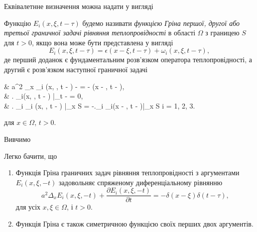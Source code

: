 Еквівалетнне визначення можна надати у вигляді
\begin{definition}
	Функцію $E_i (x, \xi, t - \tau)$ будемо називати \textit{функцією Гріна першої, другої або третьої граничної задачі рівняння теплопровідності} в області $\Omega$ з границею $S$ для $t > 0$, якщо вона може бути представлена у вигляді
	\begin{equation}
		E_i(x, \xi, t - \tau) = \epsilon(x - \xi, t - \tau) + \omega_i(x, \xi, t - \tau),
	\end{equation}
	де  перший доданок є фундаментальним розв'язком оператора теплопровідності, а другий  є розв'язком наступної граничної задачі
	\begin{system}
		& a^2 \Delta_x \omega_i (x, \xi, t - \tau) -  = - \delta(x - \xi, t - \tau), \\
		& \left. \omega_i(x, \xi, t - \tau) \right|_{t - \tau {}} = 0, \\
		& \left. \ell_i \omega_i (x, \xi, t - \tau) \right|_{x \in S} = -\left.\ell_i \epsilon_i(x - \xi, t - \tau)\right|_{x \in S} \quad i = 1, 2, 3.
	\end{system}
	для $x \in \Omega$, $t > 0$.
\end{definition}

Вивчимо 
\begin{properties}
	Легко бачити, що 
	\begin{enumerate}
		\item Функція Гріна граничних задач рівняння теплопровідності з аргументами $E_i(x, \xi, -t)$ задовольняє спряженому диференціальному рівнянню
		\begin{equation}
			a^2 \Delta_x E_i(x, \xi, -t) + \frac{\partial E_i(x, \xi, - t)}{\partial t} = - \delta(x - \xi) \delta (t - \tau), 
		\end{equation}
		для усіх $x, \xi \in \Omega$, і $t > 0$.
		\item Функція Гріна є також симетричною функцією своїх перших двох аргументів.
	\end{enumerate}
\end{properties}
	
